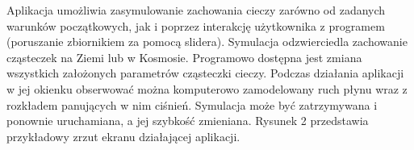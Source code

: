 Aplikacja umożliwia zasymulowanie zachowania cieczy zarówno od zadanych warunków początkowych, jak i poprzez interakcję użytkownika z programem (poruszanie zbiornikiem za pomocą slidera). Symulacja odzwierciedla zachowanie cząsteczek na Ziemi lub w Kosmosie. Programowo dostępna jest zmiana wszystkich założonych parametrów cząsteczki cieczy. Podczas działania aplikacji w jej okienku obserwować można komputerowo zamodelowany ruch płynu wraz z rozkładem panujących w nim ciśnień. Symulacja może być zatrzymywana i ponownie uruchamiana, a jej szybkość zmieniana. Rysunek 2 przedstawia przykładowy zrzut ekranu działającej aplikacji. 